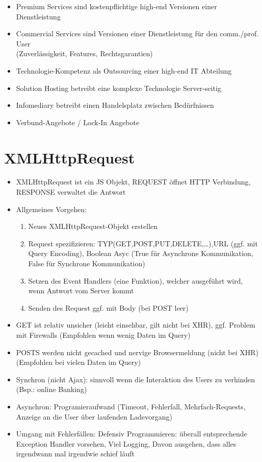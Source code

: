 \documentclass{article} %
\begin{document}
			\begin{itemize}
				\item Premium Services sind kostenpflichtige high-end Versionen einer Dienstleistung
				\item Commercial Services sind Versionen einer Dienstleistung für den comm./prof. User\\
				(Zuverlässigkeit, Features, Rechtsgarantien)
				\item Technologie-Kompetenz als Outsourcing einer high-end IT Abteilung
				\item Solution Hosting betreibt eine komplexe Technologie Server-seitig
				\item Infomediary betreibt einen Handelsplatz zwischen Bedürfnissen
				\item Verbund-Angebote / Lock-In Angebote
			\end{itemize}
			
						
	\section{XMLHttpRequest}
	\begin{itemize}
		\item XMLHttpRequest ist ein JS Objekt, REQUEST öffnet HTTP Verbindung, RESPONSE verwaltet die Antwort
		\item Allgemeines Vorgehen:
		\begin{enumerate}
			\item Neues XMLHttpRequest-Objekt erstellen
			\item Request spezifizieren: TYP(GET,POST,PUT,DELETE,\dots),URL (ggf. mit Query Encoding), Boolean Asyc (True für Asynchrone Kommunikation, False für Synchrone Kommunikation)
			\item Setzen des Event Handlers (eine Funktion), welcher ausgeführt wird, wenn Antwort vom Server kommt
			\item Senden des Request ggf. mit Body (bei POST leer)
		\end{enumerate}
		\item GET ist relativ unsicher (leicht einsehbar, gilt nicht bei XHR), ggf. Problem mit Firewalls (Empfohlen wenn wenig Daten im Query)
		\item POSTS werden nicht gecached und nervige Browsermeldung (nicht bei XHR) (Empfohlen bei vielen Daten im Query)
		\item Synchron (nicht Ajax): sinnvoll wenn die Interaktion des Users zu verhinden (Bsp.: online Banking)
		\item Asynchron: Programieraufwand (Timeout, Fehlerfall, Mehrfach-Requests, Anzeige an die User über laufenden Ladevorgang)
		\item Umgang mit Fehlerfällen: Defensiv Programmieren: überall entsprechende Exception Handler vorsehen, Viel Logging, Davon ausgehen, dass alles irgendwann mal irgendwie schief läuft
	\end{itemize}
			
\end{document}

